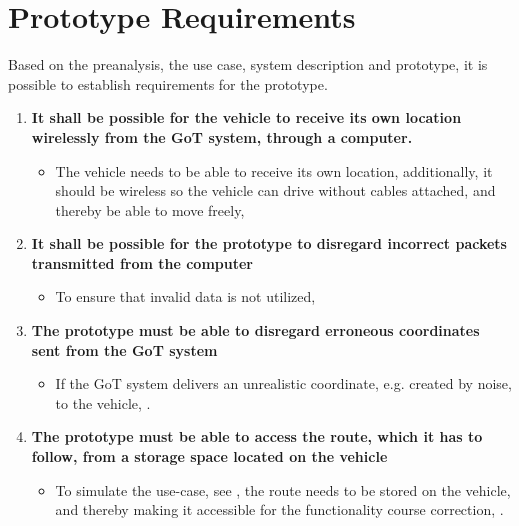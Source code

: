 \chapter{Prototype Requirements} \label{Requirements}
Based on the preanalysis, the use case, system description and prototype, it is possible to establish requirements for the prototype.

\begin{enumerate}
\item \textbf{It shall be possible for the vehicle to receive its own location wirelessly from the GoT system, through a computer.}
	\begin{itemize}
	\item[] The vehicle needs to be able to receive its own location, additionally, it should be wireless so the vehicle can drive without cables attached, and thereby be able to move freely, 
	\end{itemize}
\item \textbf{It shall be possible for the prototype to disregard incorrect packets transmitted from the computer}
	\begin{itemize}
	\item[] To ensure that invalid data is not utilized, 
	\end{itemize}
	\item \textbf{The prototype must be able to disregard erroneous coordinates sent from the GoT system}
	\begin{itemize}
	\item[] If the GoT system delivers an unrealistic coordinate, e.g. created by noise, to the vehicle, .
	\end{itemize}
\item \textbf{The prototype must be able to access the route, which it has to follow, from a storage space located on the vehicle}
	\begin{itemize}
	\item[] To simulate the use-case, see , the route needs to be stored on the vehicle, and thereby making it accessible for the functionality course correction, .
	\end{itemize}

\end{enumerate}
